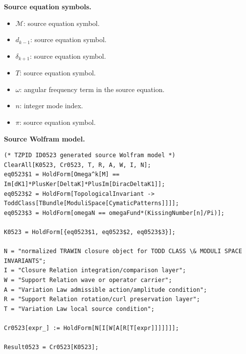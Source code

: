 \begin{minipage}[t]{0.49\linewidth}
\begingroup
\small
\raggedright
\textbf{Source equation symbols.}\par
\begin{itemize}[leftmargin=1.35em,itemsep=1pt,topsep=1pt,parsep=0pt]
    \item $\mathcal{M}$: source equation symbol.
    \item $d_{k-1}$: source equation symbol.
    \item $\delta_{k+1}$: source equation symbol.
    \item $T$: source equation symbol.
    \item $\omega$: angular frequency term in the source equation.
    \item $n$: integer mode index.
    \item $\pi$: source equation symbol.
\end{itemize}
\endgroup
\end{minipage}\hfill
\begin{minipage}[t]{0.47\linewidth}
\begingroup
\scriptsize
\raggedright
\textbf{Source Wolfram model.}\par
\begin{Verbatim}[fontsize=\tiny,breaklines=true,breakanywhere=true]
(* TZPID ID0523 generated source Wolfram model *)
ClearAll[K0523, Cr0523, T, R, A, W, I, N];
eq0523$1 = HoldForm[Omega^k[M] == Im[dK1]*PlusKer[DeltaK]*PlusIm[DiracDeltaK1]];
eq0523$2 = HoldForm[TopologicalInvariant -> ToddClass[TBundle[ModuliSpace[CymaticPatterns]]]];
eq0523$3 = HoldForm[omegaN == omegaFund*(KissingNumber[n]/Pi)];

K0523 = HoldForm[{eq0523$1, eq0523$2, eq0523$3}];

N = "normalized TRAWIN closure object for TODD CLASS \& MODULI SPACE INVARIANTS";
I = "Closure Relation integration/comparison layer";
W = "Support Relation wave or operator carrier";
A = "Variation Law admissible action/amplitude condition";
R = "Support Relation rotation/curl preservation layer";
T = "Variation Law local source condition";

Cr0523[expr_] := HoldForm[N[I[W[A[R[T[expr]]]]]]];

Result0523 = Cr0523[K0523];
\end{Verbatim}
\endgroup
\end{minipage}

